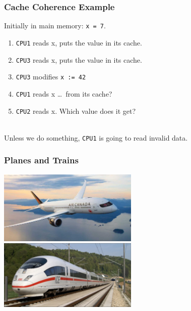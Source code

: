 \begin{frame}
  \frametitle{Cache Coherence Example}

  
  Initially in main memory: {\tt x = 7}.

  \begin{enumerate}
    \item {\tt CPU1} reads x, puts the value in its cache.
    \item {\tt CPU3} reads x, puts the value in its cache.
    \item {\tt CPU3} modifies {\tt x := 42}
    \item {\tt CPU1} reads x \ldots ~from its cache?
    \item {\tt CPU2} reads x. Which value does it get?
  \end{enumerate}
  ~\\

  Unless we do something, {\tt CPU1} is going to read invalid data.
  
\end{frame}



\begin{frame}
\frametitle{Planes and Trains}
\begin{center}
\includegraphics[width=0.5\textwidth]{images/aircanada.jpg}
\includegraphics[width=0.5\textwidth]{images/deutschebahn.png}
\end{center}
\end{frame}



